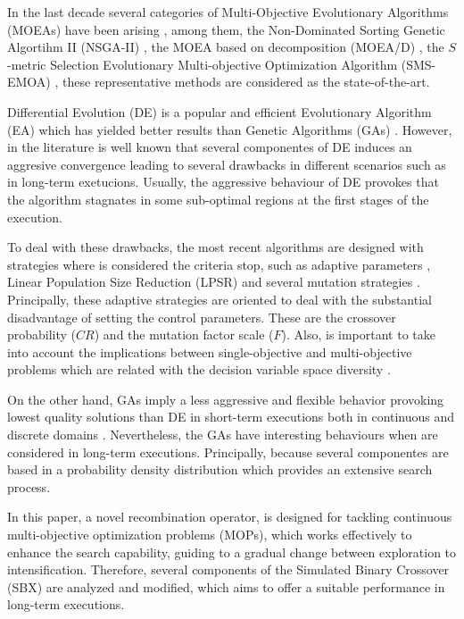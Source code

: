 In the last decade several categories of Multi-Objective Evolutionary Algorithms (MOEAs) have been arising \cite{Joel:Kalyanmoy,Joel:Coello}, among them, the Non-Dominated Sorting Genetic Algortihm II (NSGA-II) \cite{Joel:NSGAII}, the MOEA based on decomposition (MOEA/D) \cite{Joel:MOEAD}, the $S$-metric Selection Evolutionary Multi-objective Optimization Algorithm (SMS-EMOA) \cite{Joel:SMSEMOA}, these representative methods are considered as the state-of-the-art.

Differential Evolution (DE) is a popular and efficient Evolutionary Algorithm (EA) which has yielded better results than Genetic Algorithms (GAs) \cite{tuvsar2007differential, mi2010improved}.
%
However, in the literature is well known that several componentes of DE induces an aggresive convergence leading to several drawbacks in different scenarios such as in long-term exetucions.
%
Usually, the aggressive behaviour of DE provokes that the algorithm stagnates in some sub-optimal regions at the first stages of the execution.
%


To deal with these drawbacks, the most recent algorithms are designed with strategies where is considered the criteria stop, such as adaptive parameters \cite{brest2017single}, Linear Population Size Reduction (LPSR) \cite{brest2008population} and several mutation strategies \cite{das2011differential}.
%
Principally, these adaptive strategies are oriented to deal with the substantial disadvantage of setting the control parameters.
%
These are the crossover probability ($CR$) and the mutation factor scale ($F$).
%
%
Also, is important to take into account the implications between single-objective and multi-objective problems which are related with the decision variable space diversity \cite{kukkonen2007performance}.

%
On the other hand, GAs imply a less aggressive and flexible behavior provoking lowest quality solutions than DE in short-term executions both in continuous and discrete domains  \cite{tuvsar2007differential, mi2010improved}.
%
Nevertheless, the GAs have interesting behaviours when are considered in long-term executions.
%
Principally, because several componentes are based in a probability density distribution which provides an extensive search process.
%

In this paper, a novel recombination operator, is designed for tackling continuous multi-objective optimization problems (MOPs), which works effectively to enhance the search capability, guiding to a gradual change between exploration to intensification.
%
Therefore, several components of the Simulated Binary Crossover (SBX) are analyzed and modified, which aims to offer a suitable performance in long-term executions.
%

